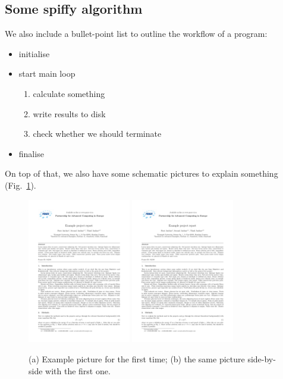 \documentclass{prace}
\begin{document}
\subsection{Some spiffy algorithm}
We also include a bullet-point list to outline the workflow of a
program:
\begin{itemize}
	\item initialise
	\item start main loop
	\begin{enumerate}
		\item calculate something
		\item write results to disk
		\item check whether we should terminate
	\end{enumerate}
	\item finalise
\end{itemize}
On top of that, we also have some schematic pictures to explain something
(Fig.~\ref{fig: example}).

\begin{figure}
	\includegraphics[width=0.4\textwidth]{example}\hfill{}
	\includegraphics[width=0.4\textwidth]{example}\hfill{}
	\caption{(a) Example picture for the first time; (b) the same picture
	side-by-side with the first one.}
	\label{fig: example}
\end{figure}
\end{document}
